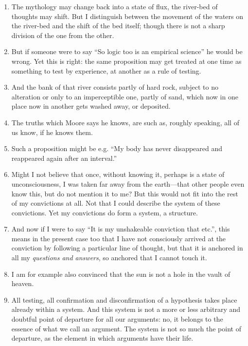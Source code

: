 \documentclass{book}
\begin{document}
\begin{enumerate}
\item
The mythology may change back into a state of flux, the river-bed of thoughts
may shift. But I distinguish between the movement of the waters on the
river-bed and the shift of the bed itself; though there is not a sharp division
of the one from the other.

\item
But if someone were to say ``So logic too is an empirical science'' he would be
wrong. Yet this is right: the same proposition may get treated at one time as
something to test by experience, at another as a rule of testing.

\item
And the bank of that river consists partly of hard rock, subject to no
alteration or only to an imperceptible one, partly of sand, which now in one
place now in another gets washed away, or deposited.

\item
The truths which Moore says he knows, are such as, roughly speaking, all of us
know, if he knows them.

\item
Such a proposition might be e.g. ``My body has never disappeared and reappeared
again after an interval.''

\item
Might I not believe that once, without knowing it, perhaps is a state of
unconsciousness, I was taken far away from the earth---that other people even
know this, but do not mention it to me? But this would not fit into the rest of
my convictions at all. Not that I could describe the system of these
convictions. Yet my convictions do form a system, a structure.

\item
And now if I were to say ``It is my unshakeable conviction that etc.'', this
means in the present case too that I have not consciously arrived at the
conviction by following a particular line of thought, but that it is anchored
in all my \emph{questions and answers}, so anchored that I cannot touch it.

\item
I am for example also convinced that the sun is not a hole in the vault of
heaven.

\item
All testing, all confirmation and disconfirmation of a hypothesis takes place
already within a system. And this system is not a more or less arbitrary and
doubtful point of departure for all our arguments: no, it belongs to the
essence of what we call an argument. The system is not so much the point of
departure, as the element in which arguments have their life.


\end{enumerate}
\end{document}

